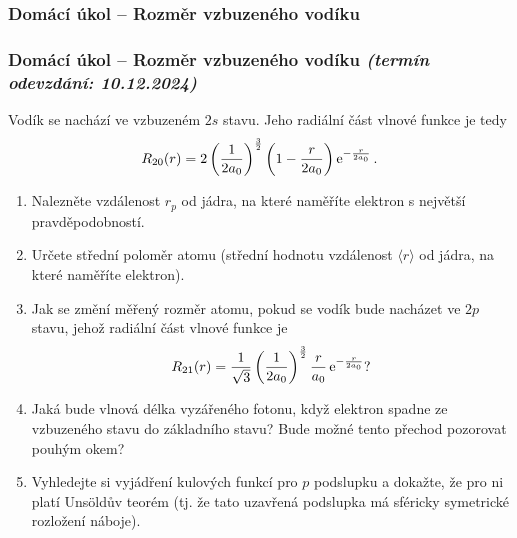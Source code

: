 \documentclass[a4paper,11pt,twoside]{article}
\newenvironment{homework}{}{}
\newcommand{\np}{\clearpage\newpage}
\newcommand{\exercise}[2][]{\ifthenelse{\isempty{#1}}
	{\np\thispagestyle{empty}\subsubsection*{Domácí úkol -- #2}}
	{\np\thispagestyle{empty}\np\subsubsection*{Domácí úkol -- #2 \small{\it{(termín odevzdání: {#1})}}}}
}
\begin{document}
\begin{homework}
	\exercise[10.12.2024]{Rozměr vzbuzeného vodíku}
		Vodík se nachází ve vzbuzeném $2s$ stavu.
		Jeho radiální část vlnové funkce je tedy
		\begin{equation*}
			R_{20}(r)=2\left(\frac{1}{2a_{0}}\right)^{\frac{3}{2}}\left(1-\frac{r}{2a_{0}}\right)\operatorname{e}^{-\frac{r}{2a_0}}.
		\end{equation*}

		\begin{enumerate}
			\item
				Nalezněte vzdálenost $r_{p}$ od jádra, na které naměříte elektron s největší pravděpodobností.

			\item
				Určete střední poloměr atomu (střední hodnotu vzdálenost $\langle r\rangle$ od jádra, na které naměříte elektron).

			\item
				Jak se změní měřený rozměr atomu, pokud se vodík bude nacházet ve $2p$ stavu, jehož radiální část vlnové funkce je
				\begin{equation*}
					R_{21}(r)=\frac{1}{\sqrt{3}}\left(\frac{1}{2a_{0}}\right)^{\frac{3}{2}}\frac{r}{a_{0}}\operatorname{e}^{-\frac{r}{2a_{0}}}?
				\end{equation*}

			\item
				Jaká bude vlnová délka vyzářeného fotonu, když elektron spadne ze vzbuzeného stavu do základního stavu?
				Bude možné tento přechod pozorovat pouhým okem?

			\item
				Vyhledejte si vyjádření kulových funkcí pro $p$ podslupku a dokažte, že pro ni platí Unsöldův teorém (tj. že tato uzavřená podslupka má sféricky symetrické rozložení náboje).
		\end{enumerate}

		\newpage
\end{homework}

\end{document}
